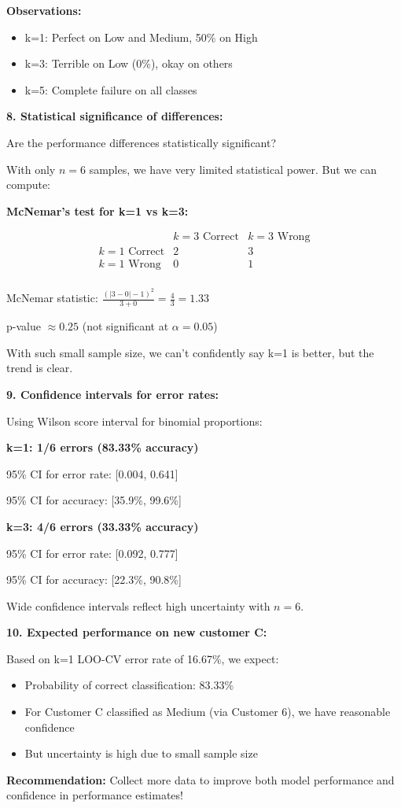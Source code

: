 \documentclass[12pt]{article}
\begin{document}
\begin{computation}
\textbf{Observations:}
\begin{itemize}
    \item k=1: Perfect on Low and Medium, 50\% on High
    \item k=3: Terrible on Low (0\%), okay on others
    \item k=5: Complete failure on all classes
\end{itemize}

\textbf{8. Statistical significance of differences:}

Are the performance differences statistically significant?

With only \(n=6\) samples, we have very limited statistical power. But we can compute:

\textbf{McNemar's test for k=1 vs k=3:}

\[
\begin{array}{c|c|c}
& k=3 \text{ Correct} & k=3 \text{ Wrong} \\
\hline
k=1 \text{ Correct} & 2 & 3 \\
k=1 \text{ Wrong} & 0 & 1 \\
\end{array}
\]

McNemar statistic: \(\frac{(|3-0|-1)^2}{3+0} = \frac{4}{3} = 1.33\)

p-value \(\approx 0.25\) (not significant at \(\alpha=0.05\))

With such small sample size, we can't confidently say k=1 is better, but the trend is clear.

\textbf{9. Confidence intervals for error rates:}

Using Wilson score interval for binomial proportions:

\textbf{k=1: 1/6 errors (83.33\% accuracy)}

95\% CI for error rate: [0.004, 0.641]

95\% CI for accuracy: [35.9\%, 99.6\%]

\textbf{k=3: 4/6 errors (33.33\% accuracy)}

95\% CI for error rate: [0.092, 0.777]

95\% CI for accuracy: [22.3\%, 90.8\%]

Wide confidence intervals reflect high uncertainty with \(n=6\).

\textbf{10. Expected performance on new customer C:}

Based on k=1 LOO-CV error rate of 16.67\%, we expect:
\begin{itemize}
    \item Probability of correct classification: 83.33\%
    \item For Customer C classified as Medium (via Customer 6), we have reasonable confidence
    \item But uncertainty is high due to small sample size
\end{itemize}

\textbf{Recommendation:} Collect more data to improve both model performance and confidence in performance estimates!
\end{computation}
\end{document}

